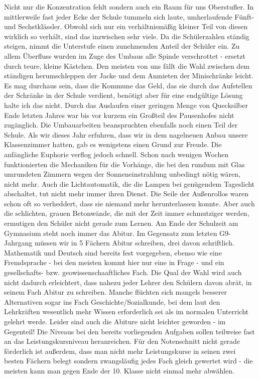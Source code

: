 \documentclass[a4paper,12pt,twoside]{scrbook}
\begin{document}
Nicht nur die Konzentration fehlt sondern auch ein Raum für uns Oberstufler. In mittlerweile fast jeder Ecke der Schule tummeln sich laute, umherlaufende Fünft- und Sechstklässler. Obwohl sich nur ein verhältnismäßig kleiner Teil von diesen wirklich so verhält, sind das inzwischen sehr viele. Da die Schülerzahlen ständig steigen, nimmt die Unterstufe einen zunehmenden Anteil der Schüler ein.
Zu allem Überfluss wurden im Zuge des Umbaus alle Spinde verschrottet - ersetzt durch teure, kleine Kästchen. Den meisten von uns fällt die Wahl zwischen dem ständigen herumschleppen der Jacke und dem Anmieten der Minischränke leicht. Es mag durchaus sein, dass die Kommune das Geld, das sie durch das Aufstellen der Schränke in der Schule verdient, benötigt aber für eine endgültige Lösung halte ich das nicht. Durch das Auslaufen einer geringen Menge von Quecksilber Ende letzten Jahres war bis vor kurzem ein Großteil des Pausenhofes nicht zugänglich. Die Umbauarbeiten beanspruchten ebenfalls noch einen Teil der Schule. Als wir dieses Jahr erfuhren, dass wir in dem nagelneuen Anbau unsere Klassenzimmer hatten, gab es wenigstens einen Grund zur Freude. Die anfängliche Euphorie verflog jedoch schnell. Schon nach wenigen Wochen funktionierten die Mechaniken für die Vorhänge, die bei den rundum mit Glas umrundeten Zimmern wegen der Sonneneinstrahlung unbedingt nötig wären, nicht mehr. Auch die Lichtautomatik, die die Lampen bei genügendem Tageslicht abschaltet, tut nicht mehr immer ihren Dienst. Die Seile der Außenrollos waren schon oft so verheddert, dass sie niemand mehr herunterlassen konnte. Aber auch die schlichten, grauen Betonwände, die mit der Zeit immer schmutziger werden, ermutigen den Schüler nicht gerade zum Lernen.
Am Ende der Schulzeit am Gymnasium steht noch immer das Abitur. Im Gegensatz zum letzten G9-Jahrgang müssen wir in 5 Fächern Abitur schreiben, drei davon schriftlich. Mathematik und Deutsch sind bereits fest vorgegeben, ebenso wie eine Fremdsprache - bei den meisten kommt hier nur eine in Frage - und ein gesellschafts- bzw. geowissenschaaftliches Fach. Die Qual der Wahl wird auch nicht dadurch erleichtert, dass nahezu jeder Lehrer den Schülern davon abrät, in seinem Fach Abitur zu schreiben. Manche flüchten sich mangels besserer Alternativen sogar ins Fach Geschichte/Sozialkunde, bei dem laut den Lehrkräften wesentlich mehr Wissen erforderlich sei als im normalen Unterricht gelehrt werde. Leider sind auch die Abiture nicht leichter geworden - im Gegenteil! Die Niveaus bei den bereits vorliegenden Aufgaben sollen teilweise fast an das Leistungskursniveau heranreichen. Für den Notenschnitt nicht gerade förderlich ist außerdem, dass man nicht mehr Leistungskurse in seinen zwei besten Fächern belegt sondern zwangsläufig jedes Fach gleich gewertet wird - die meisten kann man gegen Ende der 10. Klasse nicht einmal mehr abwählen.
\end{document}
